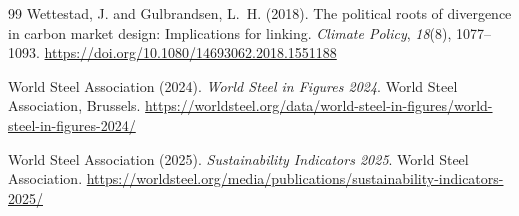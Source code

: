 \documentclass[letterpaper, 10pt, conference]{ieeeconf}
\begin{document}
\begin{thebibliography}{99}
Wettestad, J. and Gulbrandsen, L.~H. (2018).
The political roots of divergence in carbon market design: Implications for linking.
\textit{Climate Policy}, \textit{18}(8), 1077--1093.
\url{https://doi.org/10.1080/14693062.2018.1551188}

World Steel Association (2024).
\textit{World Steel in Figures 2024}.
World Steel Association, Brussels.
\url{https://worldsteel.org/data/world-steel-in-figures/world-steel-in-figures-2024/}

World Steel Association (2025).
\textit{Sustainability Indicators 2025}.
World Steel Association.
\url{https://worldsteel.org/media/publications/sustainability-indicators-2025/}

\end{thebibliography}
\end{document}
